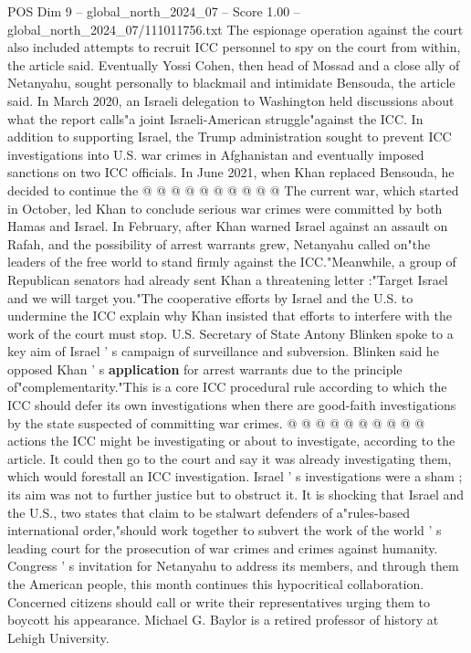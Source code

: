 \begin{textsample}{POS Dim 9 – global\_north\_2024\_07 – Score 1.00 – global\_north\_2024\_07/111011756.txt}
The espionage operation against the court also included attempts to recruit ICC personnel to spy on the court from within, the article said.
Eventually Yossi Cohen, then head of Mossad and a close ally of Netanyahu, sought personally to blackmail and intimidate Bensouda, the article said.
In March 2020, an Israeli delegation to Washington held discussions about what the report calls"a joint Israeli-American struggle"against the ICC.
In addition to supporting Israel, the Trump administration sought to prevent ICC investigations into U.S. war crimes in Afghanistan and eventually imposed sanctions on two ICC officials.
In June 2021, when Khan replaced Bensouda, he decided to continue the @ @ @ @ @ @ @ @ @ @ The current war, which started in October, led Khan to conclude serious war crimes were committed by both Hamas and Israel.
In February, after Khan warned Israel against an assault on Rafah, and the possibility of arrest warrants grew, Netanyahu called on"the leaders of the free world to stand firmly against the ICC."Meanwhile, a group of Republican senators had already sent Khan a threatening letter :"Target Israel and we will target you."The cooperative efforts by Israel and the U.S. to undermine the ICC explain why Khan insisted that efforts to interfere with the work of the court must stop.
U.S.
Secretary of State Antony Blinken spoke to a key aim of Israel ' s campaign of surveillance and subversion.
Blinken said he opposed Khan ' s \textbf{application} for arrest warrants due to the principle of"complementarity."This is a core ICC procedural rule according to which the ICC should defer its own investigations when there are good-faith investigations by the state suspected of committing war crimes. @ @ @ @ @ @ @ @ @ @ actions the ICC might be investigating or about to investigate, according to the article.
It could then go to the court and say it was already investigating them, which would forestall an ICC investigation.
Israel ' s investigations were a sham ; its aim was not to further justice but to obstruct it.
It is shocking that Israel and the U.S., two states that claim to be stalwart defenders of a"rules-based international order,"should work together to subvert the work of the world ' s leading court for the prosecution of war crimes and crimes against humanity.
Congress ' s invitation for Netanyahu to address its members, and through them the American people, this month continues this hypocritical collaboration.
Concerned citizens should call or write their representatives urging them to boycott his appearance.
Michael G.
Baylor is a retired professor of history at Lehigh University.

\end{textsample}
